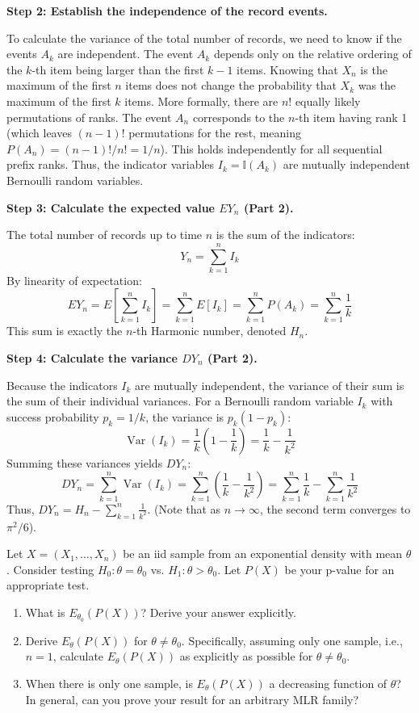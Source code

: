 \begin{solution}
\textbf{Step 2: Establish the independence of the record events.}

To calculate the variance of the total number of records, we need to know if the events $A_k$ are independent.
The event $A_k$ depends only on the relative ordering of the $k$-th item being larger than the first $k-1$ items. Knowing that $X_n$ is the maximum of the first $n$ items does not change the probability that $X_k$ was the maximum of the first $k$ items.
More formally, there are $n!$ equally likely permutations of ranks. The event $A_n$ corresponds to the $n$-th item having rank 1 (which leaves $(n-1)!$ permutations for the rest, meaning $P(A_n) = (n-1)!/n! = 1/n$). This holds independently for all sequential prefix ranks.
Thus, the indicator variables $I_k = \mathbb{I}(A_k)$ are mutually independent Bernoulli random variables.

\textbf{Step 3: Calculate the expected value $EY_n$ (Part 2).}

The total number of records up to time $n$ is the sum of the indicators:
\[ Y_n = \sum_{k=1}^n I_k \]
By linearity of expectation:
\[ EY_n = E\left[ \sum_{k=1}^n I_k \right] = \sum_{k=1}^n E[I_k] = \sum_{k=1}^n P(A_k) = \sum_{k=1}^n \frac{1}{k} \]
This sum is exactly the $n$-th Harmonic number, denoted $H_n$.

\textbf{Step 4: Calculate the variance $DY_n$ (Part 2).}

Because the indicators $I_k$ are mutually independent, the variance of their sum is the sum of their individual variances.
For a Bernoulli random variable $I_k$ with success probability $p_k = 1/k$, the variance is $p_k(1-p_k)$:
\[ \operatorname{Var}(I_k) = \frac{1}{k} \left( 1 - \frac{1}{k} \right) = \frac{1}{k} - \frac{1}{k^2} \]
Summing these variances yields $DY_n$:
\[ DY_n = \sum_{k=1}^n \operatorname{Var}(I_k) = \sum_{k=1}^n \left( \frac{1}{k} - \frac{1}{k^2} \right) = \sum_{k=1}^n \frac{1}{k} - \sum_{k=1}^n \frac{1}{k^2} \]
Thus, $DY_n = H_n - \sum_{k=1}^n \frac{1}{k^2}$. (Note that as $n \to \infty$, the second term converges to $\pi^2/6$).
\end{solution}

\begin{exercise}
\label{probability:2013:4}
Let $X = (X_1, \dots, X_n)$ be an iid sample from an exponential density with mean $\theta$. Consider testing $H_0: \theta = \theta_0$ vs. $H_1: \theta > \theta_0$. Let $P(X)$ be your p-value for an appropriate test.
\begin{enumerate}
    \item What is $E_{\theta_0}(P(X))$? Derive your answer explicitly.
    \item Derive $E_\theta(P(X))$ for $\theta \neq \theta_0$. Specifically, assuming only one sample, i.e., $n=1$, calculate $E_\theta(P(X))$ as explicitly as possible for $\theta \neq \theta_0$.
    \item When there is only one sample, is $E_\theta(P(X))$ a decreasing function of $\theta$? In general, can you prove your result for an arbitrary MLR family?
\end{enumerate}
\end{exercise}

